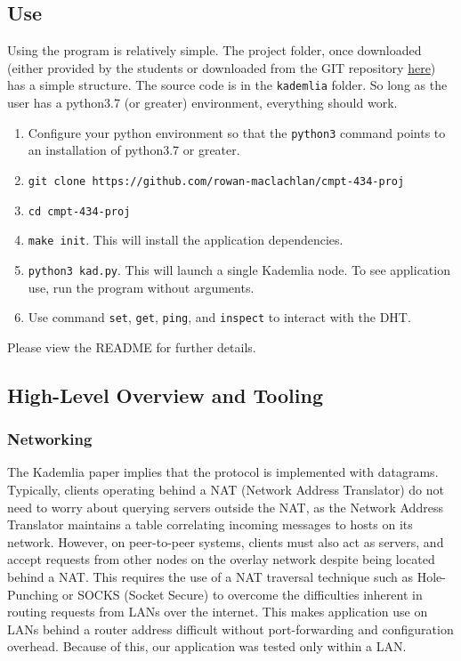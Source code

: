 \documentclass[12pt]{report}
\newcommand{\code}[1]{\colorbox{codegray}{\texttt{#1}}}
\begin{document}
        \subsection{Use}
            Using the program is relatively simple.  The project folder, once
            downloaded (either provided by the students or downloaded from the
            GIT repository
            \href{https://github.com/rowan-maclachlan/cmpt-434-proj}{here}) has
            a simple structure.  The source code is in the \code{kademlia}
            folder.  So long as the user has a python3.7 (or greater)
            environment, everything should work.
            \begin{enumerate}
                \item Configure your python environment so that the
                    \code{python3} command points to an installation of
                    python3.7 or greater.
                \item \code{git clone
                    https://github.com/rowan-maclachlan/cmpt-434-proj}
                \item \code{cd cmpt-434-proj}
                \item \code{make init}. This will install the application
                    dependencies.
                \item \code{python3 kad.py}.  This will launch a single
                    Kademlia node.  To see application use, run the program
                    without arguments.
                \item Use command \code{set}, \code{get}, \code{ping}, and
                    \code{inspect} to interact with the DHT.
            \end{enumerate}
            Please view the README for further details.
        \subsection{High-Level Overview and Tooling}
            \subsubsection{Networking}
                The Kademlia paper implies that the protocol is implemented
                with datagrams\cite{kademlia}.  Typically, clients operating
                behind a NAT (Network Address Translator) do not need to worry
                about querying servers outside the NAT, as the Network Address
                Translator maintains a table correlating incoming messages to
                hosts on its network.  However, on peer-to-peer systems,
                clients must also act as servers, and accept requests from
                other nodes on the overlay network despite being located behind
                a NAT.  This requires the use of a NAT traversal technique such
                as Hole-Punching or SOCKS (Socket Secure) to overcome the
                difficulties inherent in routing requests from LANs over the
                internet.  This makes application use on LANs behind a router
                address difficult without port-forwarding and configuration
                overhead.  Because of this, our application was tested only
                within a LAN.
\end{document}
